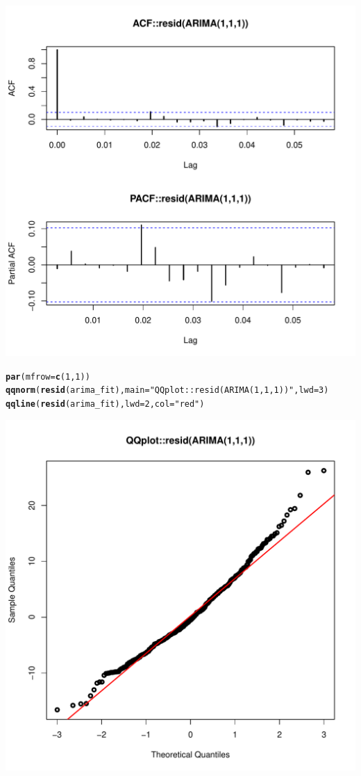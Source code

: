 \documentclass[10pt]{article}\usepackage[]{graphicx}\usepackage[]{color}
\makeatletter
\def\maxwidth{ %
  \ifdim\Gin@nat@width>\linewidth
    \linewidth
  \else
    \Gin@nat@width
  \fi
}
\newcommand{\hlnum}[1]{\textcolor[rgb]{0.686,0.059,0.569}{#1}}%
\newcommand{\hlstr}[1]{\textcolor[rgb]{0.192,0.494,0.8}{#1}}%
\newcommand{\hlstd}[1]{\textcolor[rgb]{0.345,0.345,0.345}{#1}}%
\newcommand{\hlkwc}[1]{\textcolor[rgb]{0.333,0.667,0.333}{#1}}%
\newcommand{\hlkwd}[1]{\textcolor[rgb]{0.737,0.353,0.396}{\textbf{#1}}}%
\newenvironment{kframe}{%
 \def\at@end@of@kframe{}%
 \ifinner\ifhmode%
  \def\at@end@of@kframe{\end{minipage}}%
  \begin{minipage}{\columnwidth}%
 \fi\fi%
 \def\FrameCommand##1{\hskip\@totalleftmargin \hskip-\fboxsep
 \colorbox{shadecolor}{##1}\hskip-\fboxsep
     \hskip-\linewidth \hskip-\@totalleftmargin \hskip\columnwidth}%
 \MakeFramed {\advance\hsize-\width
   \@totalleftmargin\z@ \linewidth\hsize
   \@setminipage}}%
 {\par\unskip\endMakeFramed%
 \at@end@of@kframe}
\newenvironment{knitrout}{}{} %
\makeatother
\begin{document}
\begin{knitrout}
\begin{kframe}
\end{kframe}
\includegraphics[width=\maxwidth]{figure/unnamed-chunk-12-2} 
\begin{kframe}\begin{alltt}
\hlkwd{par}\hlstd{(}\hlkwc{mfrow}\hlstd{=}\hlkwd{c}\hlstd{(}\hlnum{1}\hlstd{,}\hlnum{1}\hlstd{))}
\hlkwd{qqnorm}\hlstd{(}\hlkwd{resid}\hlstd{(arima_fit),} \hlkwc{main}\hlstd{=}\hlstr{"QQplot::resid(ARIMA(1,1,1))"}\hlstd{,} \hlkwc{lwd}\hlstd{=}\hlnum{3}\hlstd{)}
\hlkwd{qqline}\hlstd{(}\hlkwd{resid}\hlstd{(arima_fit),} \hlkwc{lwd}\hlstd{=}\hlnum{2}\hlstd{,} \hlkwc{col}\hlstd{=}\hlstr{"red"}\hlstd{)}
\end{alltt}
\end{kframe}
\includegraphics[width=\maxwidth]{figure/unnamed-chunk-12-3} 

\end{knitrout}
\end{document}
